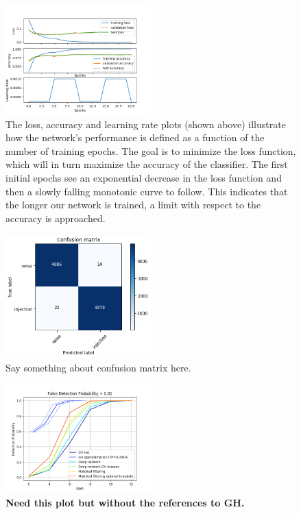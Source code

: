 \documentclass[%
 amsmath,amssymb,
 aps,
 twocolumn,
]{revtex4-1}
\begin{document}
\begin{figure}[]
 \includegraphics[width=0.5\textwidth]
 {figures/loss.png}
 \caption{\label{fig:loss curve ex} The loss, accuracy and learning rate plots (shown above) illustrate how the network's performance is defined as a function of the number of training epochs. The goal is to minimize the loss function, which will in turn maximize the accuracy of the classifier. The first initial epochs see an exponential decrease in the loss function and then a slowly falling monotonic curve to follow. This indicates that the longer our network is trained, a limit with respect to the accuracy is approached.}
\end{figure}

\begin{figure}[]
 \centering
  \includegraphics[width=0.5\textwidth]
 {figures/confusion_matrix.png}
 \caption{\label{fig:confusion} Say something about confusion matrix here.}
\end{figure}

\begin{figure}[]
 \includegraphics[width=0.5\textwidth]
 {figures/acc_both_0_01_up.png}
 \caption{\label{fig:accuracy} \textbf{Need this plot but without the references to GH.}}
\end{figure}
\end{document}
